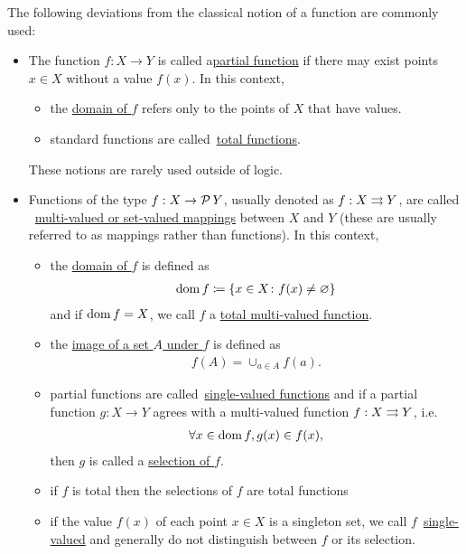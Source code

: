 \begin{definition}
  The following deviations from the classical notion of a function are commonly used:
  \begin{itemize}
    \item\label{def:function/partial} The function $f: X \to Y$ is called a\ul{partial function} if there may exist points $x \in X$ without a value $f(x)$. In this context,
    \begin{itemize}
      \item the \ul{domain of $f$} refers only to the points of $X$ that have values.
      \item standard functions are called~\ul{total functions}.
    \end{itemize}

    These notions are rarely used outside of logic.

    \item\label{def:function/multivalued} Functions of the type $f: X \to \operatorname{\mathcal P} Y$, usually denoted as $f: X \rightrightarrows Y$, are called ~\ul{multi-valued or set-valued mappings} between $X$ and $Y$ (these are usually referred to as mappings rather than functions). In this context,
    \begin{itemize}
      \item the \ul{domain of $f$} is defined as
      \begin{align*}
        \operatorname{dom} f \coloneqq \{ x \in X \colon f(x) \neq \varnothing \}
      \end{align*}
      and if $\operatorname{dom} f = X$, we call $f$ a \ul{total multi-valued function}.

      \item the \ul{image of a set $A$ under $f$} is defined as
      \begin{align*}
        f(A) = \cup_{a \in A} f(a).
      \end{align*}

      \item partial functions are called~\ul{single-valued functions} and if a partial function $g: X \to Y$ agrees with a multi-valued function $f: X \rightrightarrows Y$, i.e.
      \begin{align*}
        \forall x \in \operatorname{dom} f, g(x) \in f(x),
      \end{align*}
      then $g$ is called a \ul{selection of $f$}.

      \item if $f$ is total then the selections of $f$ are total functions

      \item if the value $f(x)$ of each point $x \in X$ is a singleton set, we call $f$~\ul{single-valued} and generally do not distinguish between $f$ or its selection.
    \end{itemize}
  \end{itemize}
\end{definition}

